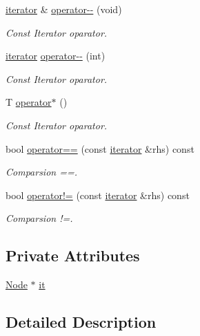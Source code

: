 \begin{DoxyCompactItemize}
\hyperlink{classsc_1_1list_1_1iterator}{iterator} \& \hyperlink{classsc_1_1list_1_1iterator_ac12691e2087705b22bbd5fc5828cd39a}{operator-\/-\/} (void)
\begin{DoxyCompactList}\small\item\em Const Iterator oparator. \end{DoxyCompactList}\item 
\hyperlink{classsc_1_1list_1_1iterator}{iterator} \hyperlink{classsc_1_1list_1_1iterator_ae5780db46cc0e71abd3b8be55daddded}{operator-\/-\/} (int)
\begin{DoxyCompactList}\small\item\em Const Iterator oparator. \end{DoxyCompactList}\item 
T \hyperlink{classsc_1_1list_1_1iterator_ae5a2616c2bf5fa033cb83a4120c35b36}{operator$\ast$} ()
\begin{DoxyCompactList}\small\item\em Const Iterator oparator. \end{DoxyCompactList}\item 
bool \hyperlink{classsc_1_1list_1_1iterator_a26eaacd8583e5d26a65cd6f6ef31f2bb}{operator==} (const \hyperlink{classsc_1_1list_1_1iterator}{iterator} \&rhs) const
\begin{DoxyCompactList}\small\item\em Comparsion ==. \end{DoxyCompactList}\item 
bool \hyperlink{classsc_1_1list_1_1iterator_aa8328f0336cb54e2c2fbd3925db7e88b}{operator!=} (const \hyperlink{classsc_1_1list_1_1iterator}{iterator} \&rhs) const
\begin{DoxyCompactList}\small\item\em Comparsion !=. \end{DoxyCompactList}\end{DoxyCompactItemize}
\subsection*{Private Attributes}
\begin{DoxyCompactItemize}
\item 
\hyperlink{structsc_1_1list_1_1_node}{Node} $\ast$ \hyperlink{classsc_1_1list_1_1iterator_aea61cc70ea3b0c69e1e7eee809bf4cef}{it}
\end{DoxyCompactItemize}


\subsection{Detailed Description}
